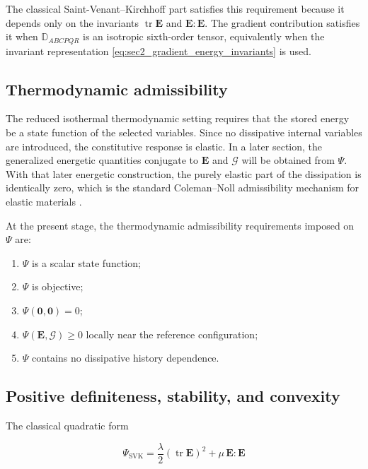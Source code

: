 \documentclass[11pt]{article}
\DeclareMathOperator{\tr}{tr}
\begin{document}
The classical Saint-Venant--Kirchhoff part satisfies this requirement because it depends only on the invariants $\tr\mathbf{E}$ and $\mathbf{E}:\mathbf{E}$. The gradient contribution satisfies it when $\mathbb{D}_{ABCPQR}$ is an isotropic sixth-order tensor, equivalently when the invariant representation \eqref{eq:sec2_gradient_energy_invariants} is used.

\subsection{Thermodynamic admissibility}

The reduced isothermal thermodynamic setting requires that the stored energy be a state function of the selected variables. Since no dissipative internal variables are introduced, the constitutive response is elastic. In a later section, the generalized energetic quantities conjugate to $\mathbf{E}$ and $\bm{\mathcal{G}}$ will be obtained from $\Psi$. With that later energetic construction, the purely elastic part of the dissipation is identically zero, which is the standard Coleman--Noll admissibility mechanism for elastic materials \cite{ColemanNoll1963,GurtinFriedAnand2010}.

At the present stage, the thermodynamic admissibility requirements imposed on $\Psi$ are:

\begin{enumerate}
\item $\Psi$ is a scalar state function;
\item $\Psi$ is objective;
\item $\Psi(\mathbf{0},\mathbf{0})=0$;
\item $\Psi(\mathbf{E},\bm{\mathcal{G}})\ge 0$ locally near the reference configuration;
\item $\Psi$ contains no dissipative history dependence.
\end{enumerate}

\subsection{Positive definiteness, stability, and convexity}

The classical quadratic form

\begin{equation}
\Psi_{\mathrm{SVK}}
=
\frac{\lambda}{2}(\tr\mathbf{E})^2+\mu\,\mathbf{E}:\mathbf{E}
\label{eq:sec2_classical_positive_form}
\end{equation}
\end{document}
